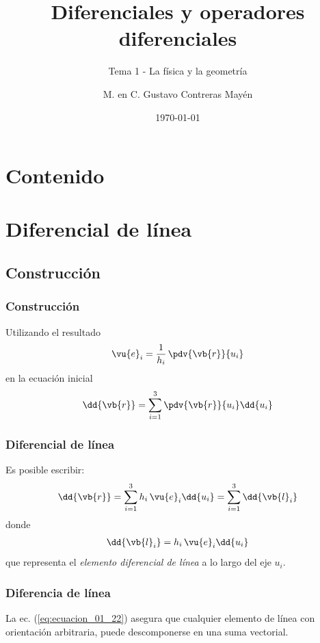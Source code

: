 
\title{\large{Diferenciales y operadores diferenciales}}
\subtitle{Tema 1 - La física y la geometría}
\author{M. en C. Gustavo Contreras Mayén}
\date{\today}

\maketitle
\fontsize{14}{14}\selectfont
{}
\section*{Contenido}
\section{Diferencial de línea}
\subsection{Construcción}
\begin{frame}
\frametitle{Construcción}
Utilizando el resultado
\begin{align*}
\vu{e}_{i} = \dfrac{1}{h_{i}} \, \pdv{\vb{r}}{u_{i}}
\end{align*}
en la ecuación inicial
\begin{align*}
\dd{\vb{r}} = \sum_{i=1}^{3} \pdv{\vb{r}}{u_{i}} \dd{u_{i}}
\end{align*}
\end{frame}
\begin{frame}
\frametitle{Diferencial de línea}
Es posible escribir:
\begin{align}
\dd{\vb{r}} = \sum_{i=1}^{3} h_{i} \, \vu{e}_{i} \dd{u_{i}} = \sum_{i=1}^{3} \dd{\vb{l}_{i}}
\label{eq:ecuacion_01_21}
\end{align}
\pause
donde
\begin{align}
\dd{\vb{l}_{i}} = h_{i} \, \vu{e}_{i} \dd{u_{i}}
\label{eq:ecuacion_01_22}
\end{align}
que representa el \emph{elemento diferencial de línea} a lo largo del eje $u_{i}$.
\end{frame}
\begin{frame}
\frametitle{Diferencia de línea}
La ec. (\ref{eq:ecuacion_01_22}) asegura que cualquier elemento de línea con orientación arbitraria, puede descomponerse en una suma vectorial.
\end{frame}
